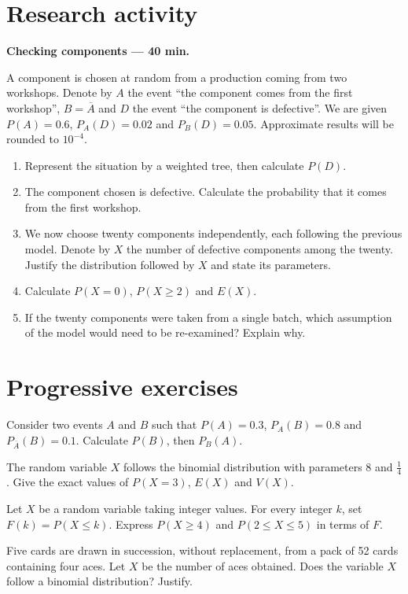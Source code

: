 \mxnewpage
\section{Research activity}\textbf{Checking components --- 40 min.}\par A component is chosen at random from a production coming from two workshops. Denote by $A$ the event ``the component comes from the first workshop'', $B=\overline A$ and $D$ the event ``the component is defective''. We are given $P(A)=\num{0,6}$, $P_A(D)=\num{0,02}$ and $P_B(D)=\num{0,05}$. Approximate results will be rounded to $10^{-4}$.
\begin{enumerate}\item Represent the situation by a weighted tree, then calculate $P(D)$.
\item The component chosen is defective. Calculate the probability that it comes from the first workshop.
\item We now choose twenty components independently, each following the previous model. Denote by $X$ the number of defective components among the twenty. Justify the distribution followed by $X$ and state its parameters.
\item Calculate $P(X=0)$, $P(X\ge2)$ and $E(X)$.
\item If the twenty components were taken from a single batch, which assumption of the model would need to be re-examined? Explain why.\end{enumerate}

\mxnewpage
\section{Progressive exercises}

Consider two events $A$ and $B$ such that $P(A)=\num{0,3}$, $P_A(B)=\num{0,8}$ and $P_{\overline A}(B)=\num{0,1}$. Calculate $P(B)$, then $P_B(A)$.

The random variable $X$ follows the binomial distribution with parameters $8$ and $\frac14$. Give the exact values of $P(X=3)$, $E(X)$ and $V(X)$.

Let $X$ be a random variable taking integer values. For every integer $k$, set $F(k)=P(X\le k)$. Express $P(X\ge4)$ and $P(2\le X\le5)$ in terms of $F$.

Five cards are drawn in succession, without replacement, from a pack of 52 cards containing four aces. Let $X$ be the number of aces obtained. Does the variable $X$ follow a binomial distribution? Justify.

